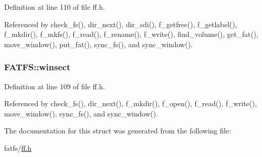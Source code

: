 Definition at line 110 of file ff.\-h.



Referenced by check\-\_\-fs(), dir\-\_\-next(), dir\-\_\-sdi(), f\-\_\-getfree(), f\-\_\-getlabel(), f\-\_\-mkdir(), f\-\_\-mkfs(), f\-\_\-read(), f\-\_\-rename(), f\-\_\-write(), find\-\_\-volume(), get\-\_\-fat(), move\-\_\-window(), put\-\_\-fat(), sync\-\_\-fs(), and sync\-\_\-window().

\hypertarget{structFATFS_ac60e69c00e6bf7c25febfbac4dc1476b}{
\subsubsection[{winsect}]{ F\-A\-T\-F\-S\-::winsect}}\label{structFATFS_ac60e69c00e6bf7c25febfbac4dc1476b}


Definition at line 109 of file ff.\-h.



Referenced by check\-\_\-fs(), dir\-\_\-next(), f\-\_\-mkdir(), f\-\_\-open(), f\-\_\-read(), f\-\_\-write(), move\-\_\-window(), sync\-\_\-fs(), and sync\-\_\-window().



The documentation for this struct was generated from the following file\-:\begin{DoxyCompactItemize}
\item 
fatfs/\hyperlink{ff_8h}{ff.\-h}\end{DoxyCompactItemize}
